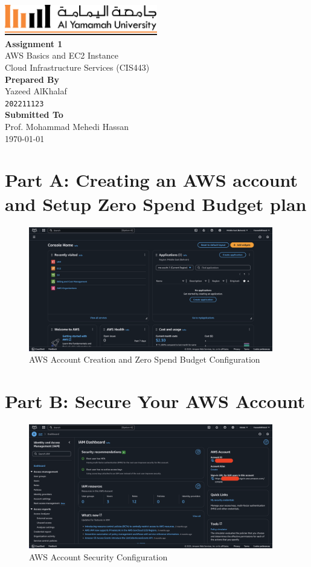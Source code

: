 \documentclass[a4paper,12pt]{article}
\def\maketitle{
  \begin{titlepage}
    \centering
    \vspace*{-1cm}
    \includegraphics[width=0.5\textwidth]{yu-logo.png}\\[2cm]
    
    {\huge\bfseries Assignment 1\\}
    \vspace{0.5cm}
    {\Large AWS Basics and EC2 Instance}\\[1.5cm]
    
    {\large Cloud Infrastructure Services (CIS443)}\\[3cm]
    
    {\large\bfseries Prepared By}\\[0.3cm]
    {\Large Yazeed AlKhalaf}\\
    {\texttt{202211123}}\\[2cm]
    
    {\large\bfseries Submitted To}\\[0.3cm]
    {\Large Prof. Mohammad Mehedi Hassan}\\[2cm]
    
    {\large \today}
    
    \vfill
  \end{titlepage}
}
\begin{document}
\maketitle

\thispagestyle{fancy}
\tableofcontents
\newpage

\thispagestyle{fancy}
\listoffigures
\newpage

\setcounter{page}{1}

\section{Part A: Creating an AWS account and Setup Zero Spend Budget plan}

\begin{figure}[H]
    \centering
    \includegraphics[width=0.95\textwidth]{aws-account.png}
    \caption{AWS Account Creation and Zero Spend Budget Configuration}
    \label{fig:aws-account}
\end{figure}

\newpage

\section{Part B: Secure Your AWS Account}

\begin{figure}[H]
    \centering
    \includegraphics[width=0.95\textwidth]{secure-your-account.png}
    \caption{AWS Account Security Configuration}
    \label{fig:secure-account}
\end{figure}
\end{document}
